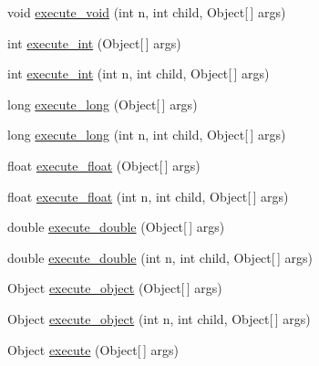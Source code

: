\begin{DoxyCompactItemize}
\item 
void \hyperlink{classorg_1_1jgap_1_1gp_1_1impl_1_1_program_chromosome_a92fd1beeb17969fc404237251003e388}{execute\-\_\-void} (int n, int child, Object\mbox{[}$\,$\mbox{]} args)
\item 
int \hyperlink{classorg_1_1jgap_1_1gp_1_1impl_1_1_program_chromosome_a3d0cb8958612150faaab36f418a8777e}{execute\-\_\-int} (Object\mbox{[}$\,$\mbox{]} args)
\item 
int \hyperlink{classorg_1_1jgap_1_1gp_1_1impl_1_1_program_chromosome_affb613bc931c4b3be35fc7cca9ed1feb}{execute\-\_\-int} (int n, int child, Object\mbox{[}$\,$\mbox{]} args)
\item 
long \hyperlink{classorg_1_1jgap_1_1gp_1_1impl_1_1_program_chromosome_a8296c9d5187129c039ad4053d4d70ea4}{execute\-\_\-long} (Object\mbox{[}$\,$\mbox{]} args)
\item 
long \hyperlink{classorg_1_1jgap_1_1gp_1_1impl_1_1_program_chromosome_a63c4c4c86434ae1a0c9f4febe21e6572}{execute\-\_\-long} (int n, int child, Object\mbox{[}$\,$\mbox{]} args)
\item 
float \hyperlink{classorg_1_1jgap_1_1gp_1_1impl_1_1_program_chromosome_acbd9e0bc12ba6077893ffc9d1ab3d085}{execute\-\_\-float} (Object\mbox{[}$\,$\mbox{]} args)
\item 
float \hyperlink{classorg_1_1jgap_1_1gp_1_1impl_1_1_program_chromosome_a8b8e3b3cdda9a453f7854418edfbe0c9}{execute\-\_\-float} (int n, int child, Object\mbox{[}$\,$\mbox{]} args)
\item 
double \hyperlink{classorg_1_1jgap_1_1gp_1_1impl_1_1_program_chromosome_a9462046182cf58ed4d59729fa584586a}{execute\-\_\-double} (Object\mbox{[}$\,$\mbox{]} args)
\item 
double \hyperlink{classorg_1_1jgap_1_1gp_1_1impl_1_1_program_chromosome_aca61c643bfcfc2e3fbbba2d6ef55e170}{execute\-\_\-double} (int n, int child, Object\mbox{[}$\,$\mbox{]} args)
\item 
Object \hyperlink{classorg_1_1jgap_1_1gp_1_1impl_1_1_program_chromosome_a49bbf47534a08674eefdbd40c4103534}{execute\-\_\-object} (Object\mbox{[}$\,$\mbox{]} args)
\item 
Object \hyperlink{classorg_1_1jgap_1_1gp_1_1impl_1_1_program_chromosome_aef96a42e1986888e049781e8202b8df3}{execute\-\_\-object} (int n, int child, Object\mbox{[}$\,$\mbox{]} args)
\item 
Object \hyperlink{classorg_1_1jgap_1_1gp_1_1impl_1_1_program_chromosome_a2aac4f2020dfe3929473d163929b1971}{execute} (Object\mbox{[}$\,$\mbox{]} args)
\item 

\end{DoxyCompactItemize}

